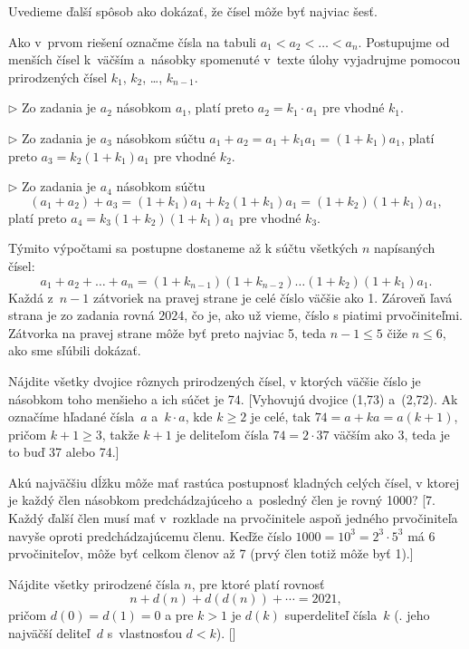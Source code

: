 {\ineriesenie
Uvedieme ďalší spôsob ako dokázať, že čísel môže byť najviac šesť.

Ako v~prvom riešení označme čísla na tabuli $a_1<a_2<\dots<a_n$. Postupujme od menších čísel k~väčším a~násobky spomenuté v~texte úlohy vyjadrujme pomocou prirodzených čísel $k_1$, $k_2$, \dots, $k_{n-1}$.

\smallskip

\item{$\triangleright$} Zo zadania je $a_2$ násobkom $a_1$, platí preto $a_2=k_1\cdot a_1$ pre vhodné $k_1$.
\item{$\triangleright$} Zo zadania je $a_3$ násobkom súčtu $a_1+a_2=a_1+k_1a_1=(1+k_1)a_1$, platí preto $a_3=k_2(1+k_1)a_1$ pre vhodné $k_2$.
\item{$\triangleright$} Zo zadania je $a_4$ násobkom súčtu
 $$(a_1+a_2)+a_3 = (1+k_1)a_1 + k_2(1+k_1)a_1 = (1+k_2)(1+k_1)a_1,$$
 platí preto $a_4=k_3(1+k_2)(1+k_1)a_1$ pre vhodné $k_3$.

\smallskip\noindent
Týmito výpočtami sa postupne dostaneme až k súčtu všetkých $n$ napísaných čísel:
$$a_1+a_2+\dots +a_n = (1+k_{n-1})(1+k_{n-2})\dots (1+k_2)(1+k_1)a_1.
$$
Každá z~$n-1$ zátvoriek na pravej strane je celé číslo väčšie ako 1. Zároveň ľavá strana je zo zadania rovná $2024$, čo je, ako už vieme, číslo s piatimi prvočiniteľmi.
Zátvorka na pravej strane môže byť preto najviac 5, teda $n-1\le 5$ čiže $n\le 6$, ako sme sľúbili dokázať.


Nájdite všetky dvojice rôznych prirodzených čísel, v ktorých väčšie číslo je násobkom toho menšieho a ich súčet je 74.
 [Vyhovujú dvojice (1,73) a~(2,72). Ak označíme hľadané čísla~$a$
a~$k\cdot a$, kde $k\ge 2$ je celé, tak $74=a+ka=a(k+1)$, pričom $k+1\ge3$, takže $k+1$ je deliteľom čísla $74=2\cdot 37$ väčším ako $3$, teda je to buď 37 alebo 74.]

Akú najväčšiu dĺžku môže mať rastúca postupnosť kladných celých čísel, v ktorej je každý člen násobkom predchádzajúceho a~posledný člen je rovný 1000?
 [7. Každý ďalší člen musí mať v~rozklade na prvočinitele aspoň jedného prvočiniteľa navyše oproti predchádzajúcemu členu. Keďže číslo $1000=10^3=2^3\cdot 5^3$ má 6 prvočiniteľov, môže byť celkom členov až 7 (prvý člen totiž môže byť 1).]
\D

Nájdite všetky prirodzené čísla $n$, pre ktoré platí rovnosť
$$
n+d(n)+d(d(n))+\cdots=2021,
$$
pričom $d(0)=d(1)=0$ a pre $k>1$ je $d(k)$ superdeliteľ čísla~$k$
(\tj. jeho najväčší deliteľ~$d$ s~vlastnosťou $d<k$).
    []

}

